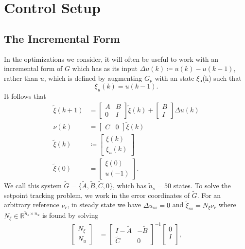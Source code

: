 \documentclass[journal,12pt,twocolumn,twoside]{IEEEtran/IEEEtran}
\newcommand{\du}{\ensuremath{\Delta u }\xspace}
\newcommand{\Gd}{\ensuremath{\tilde G }\xspace}
\newcommand{\Ad}{\ensuremath{\tilde A }\xspace}
\newcommand{\Bd}{\ensuremath{\tilde B }\xspace}
\newcommand{\Cd}{\ensuremath{\tilde C }\xspace}
\newcommand{\xd}{\ensuremath{\tilde \xi }\xspace}
\newcommand{\x}{\ensuremath{\xi }\xspace}
\newcommand{\xdss}{\ensuremath{\tilde \xi_{ss} }\xspace}
\newcommand{\y}{\ensuremath{\nu} \xspace}
\begin{document}
\section{Control Setup}
\subsection{The Incremental Form}
In the optimizations we consider, it will often be useful to work with an incremental form of \(G\) which has as its input \({\Delta u(k)\coloneqq u(k)-u(k-1)}\), rather than \(u\), which is defined by augmenting \(G_p\) with an state \x\(_{\text{u}}\)(k) such that
\begin{equation*}
  \x_u(k) = u(k-1).
\end{equation*}
It follows that
\begin{subequations}
\begin{align}
  \xd(k+1)
  &=
    \begin{bmatrix}
      A & B\\ 0 & I
    \end{bmatrix}
    \xd(k)
    +
    \begin{bmatrix}
      B\\I
    \end{bmatrix}
  \Delta u(k) \\
  \y(k) & = \begin{bmatrix}C & 0\end{bmatrix}\xd(k)\\
  \xd(k)& \coloneqq \begin{bmatrix}\x(k)\\\x_u(k) \end{bmatrix}\\
  \xd(0) & = \begin{bmatrix}\x(0)\\u(-1)\end{bmatrix}. \label{eqn:x0_aug}
\end{align}\label{eqn:ssdelta}%
\end{subequations}
We call this system \(\Gd = \{\Ad, \Bd, \Cd, 0\}\), which has \({\tilde{n}_s=50}\) states.
To solve the setpoint tracking problem, we work in the error
coordinates of \(\Gd\).
For an arbitrary reference \(\y_r\), in steady state we have \({\du_{ss}=0}\) and \(\xdss =N_{\xi}\y_r\) where \({N_{\xi}\in\mathds{R}^{\tilde{n}_s\times n_u} }\) is found by solving
\begin{align}
  \begin{bmatrix}N_{\xi} \\ N_u\end{bmatrix} &=
\begin{bmatrix}I-\Ad & -\Bd\\\Cd & 0\end{bmatrix}^{-1}\begin{bmatrix}0\\ I\\\end{bmatrix}\label{eqn:nxnu},
\end{align}
\end{document}
